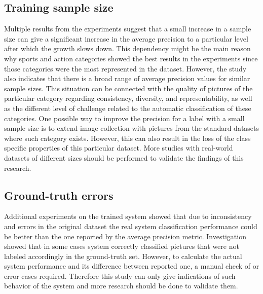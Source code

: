 \subsection{Training sample size}
Multiple results from the experiments suggest that a small increase in a sample size can give a significant increase in the average precision to a particular level after which the growth slows down. This dependency might be the main reason why sports and action categories showed the best results in the experiments since those categories were the most represented in the dataset. However, the study also indicates that there is a broad range of average precision values for similar sample sizes. This situation can be connected with the quality of pictures of the particular category regarding consistency, diversity, and representability, as well as the different level of challenge related to the automatic classification of these categories. One possible way to improve the precision for a label with a small sample size is to extend image collection with pictures from the standard datasets where such category exists. However, this can also result in the loss of the class specific properties of this particular dataset. More studies with real-world datasets of different sizes should be performed to validate the findings of this research.


\subsection{Ground-truth errors}
Additional experiments on the trained system showed that due to inconsistency and errors in the original dataset the real system classification performance could be better than the one reported by the average precision metric. Investigation showed that in some cases system correctly classified pictures that were not labeled accordingly in the ground-truth set. However, to calculate the actual system performance and its difference between reported one, a manual check of or error cases required. Therefore this study can only give indications of such behavior of the system and more research should be done to validate them.


